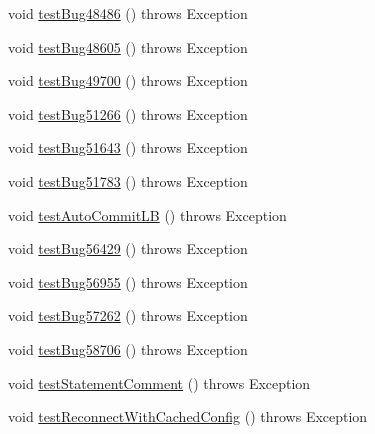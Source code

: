 \begin{DoxyCompactItemize}
\item 
void \mbox{\hyperlink{classtestsuite_1_1regression_1_1_connection_regression_test_aef31014edef12f94489910dca77cd3bd}{test\+Bug48486}} ()  throws Exception 
\item 
void \mbox{\hyperlink{classtestsuite_1_1regression_1_1_connection_regression_test_a73da16a9f5b97e2e65126c384a92bff7}{test\+Bug48605}} ()  throws Exception 
\item 
void \mbox{\hyperlink{classtestsuite_1_1regression_1_1_connection_regression_test_aa25d8717efd9b6dbbd5599be245709d5}{test\+Bug49700}} ()  throws Exception 
\item 
void \mbox{\hyperlink{classtestsuite_1_1regression_1_1_connection_regression_test_a66af567bf78544ff04968c093699c0e9}{test\+Bug51266}} ()  throws Exception 
\item 
void \mbox{\hyperlink{classtestsuite_1_1regression_1_1_connection_regression_test_a6578b077e33f9e745659a684dbc9f0d3}{test\+Bug51643}} ()  throws Exception 
\item 
void \mbox{\hyperlink{classtestsuite_1_1regression_1_1_connection_regression_test_aabb4fe98132d62a2f423df4c852aeb2f}{test\+Bug51783}} ()  throws Exception 
\item 
void \mbox{\hyperlink{classtestsuite_1_1regression_1_1_connection_regression_test_a067153b9ee68b147864c612091fb448b}{test\+Auto\+Commit\+LB}} ()  throws Exception 
\item 
void \mbox{\hyperlink{classtestsuite_1_1regression_1_1_connection_regression_test_ace950f75f2afe259c26e3ba44b232858}{test\+Bug56429}} ()  throws Exception 
\item 
void \mbox{\hyperlink{classtestsuite_1_1regression_1_1_connection_regression_test_a74522f0846d636e2416e3945328df41f}{test\+Bug56955}} ()  throws Exception 
\item 
void \mbox{\hyperlink{classtestsuite_1_1regression_1_1_connection_regression_test_ab7aa86f07bb30f6aa136ff5e64a7ae9b}{test\+Bug57262}} ()  throws Exception 
\item 
void \mbox{\hyperlink{classtestsuite_1_1regression_1_1_connection_regression_test_a64b46c67e2a3429a3bda79a2f6457593}{test\+Bug58706}} ()  throws Exception 
\item 
void \mbox{\hyperlink{classtestsuite_1_1regression_1_1_connection_regression_test_ad7e9aeaef89ee65b54c0bee0d657c6d8}{test\+Statement\+Comment}} ()  throws Exception 
\item 
void \mbox{\hyperlink{classtestsuite_1_1regression_1_1_connection_regression_test_a2d8f34ca06414604872c54f05d97ae7a}{test\+Reconnect\+With\+Cached\+Config}} ()  throws Exception 

\end{DoxyCompactItemize}
